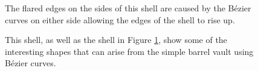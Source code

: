 \documentclass{thesis}
\begin{document}
\begin{figure}
\caption[Flared shell]{The flared edges on the sides of this shell are caused by the B\'{e}zier curves on either side
allowing the edges of the shell to rise up.}
\label{fig:thing_with_wings}
\end{figure}

\begin{figure}
\caption[Modified barrel vault]{This shell, as well as the shell in Figure \ref{fig:thing_with_wings}, show some of the
interesting shapes that can arise from the simple barrel vault using B\'{e}zier curves.}
\label{fig:countercurve}
\end{figure}
\end{document}
